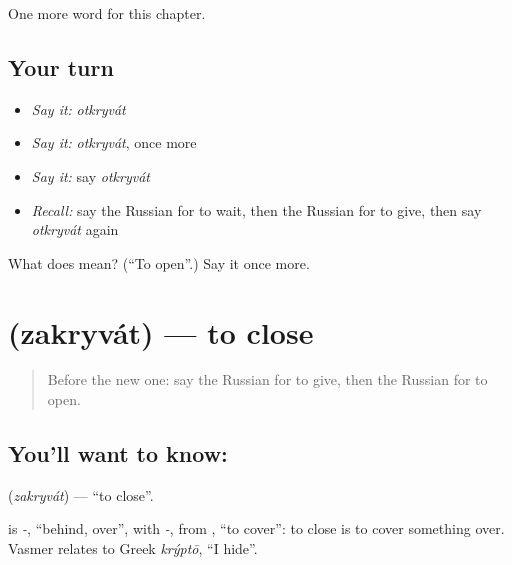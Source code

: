 \begin{grammarlens}[title={What you've built}]
One more word for this chapter.
\end{grammarlens}

\subsection*{Your turn}
\begin{itemize}
\raggedright
  \item \emph{Say it:} \emph{otkryvát}
  \item \emph{Say it:} \emph{otkryvát}, once more
  \item \emph{Say it:} say \emph{otkryvát}
  \item \emph{Recall:} say the Russian for to wait, then the Russian for to give, then say \emph{otkryvát} again
\end{itemize}

\begin{tcolorbox}[breakable,colback=teal!4,colframe=teal!35!black,title={Before you move on}]
What does  mean? (\textquotedblleft{}To open\textquotedblright{}.) Say it once more.
\end{tcolorbox}
\section[\texorpdfstring{\ru{закрывать} (zakryvát)}{закрывать (zakryvát)}]{ (zakryvát) — to close}

\label{lesson:RU-C42-zakryvat}



\begin{quote}
Before the new one: say the Russian for to give, then the Russian for to open.
\end{quote}

\subsection*{You'll want to know: }
\textbf{} (\emph{zakryvát}) — \textquotedblleft{}to close\textquotedblright{}.

\begin{cousinweb}
\textbf{} is \emph{-}, \textquotedblleft{}behind, over\textquotedblright{}, with \emph{-}, from \emph{}, \textquotedblleft{}to cover\textquotedblright{}: to close is to cover something over. Vasmer relates \emph{} to Greek \emph{krýptō}, \textquotedblleft{}I hide\textquotedblright{}.
\end{cousinweb}

